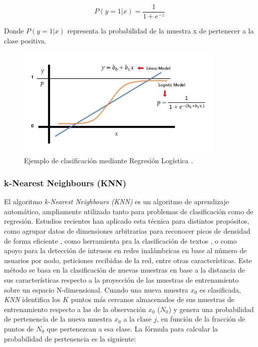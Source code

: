 \documentclass{uathesis-es}
\begin{document}
	\[
	P(y = 1 | x) = \frac{1}{1 + e^{-z}}
	\]
	
	Donde $P(y = 1 | x)$ representa la probabilidad de la muestra x de pertenecer a la clase positiva.
	
	
	\begin{figure}[h]
		\centering
		\includegraphics[width=10cm]{Figures/Background/LogReg_1.png}
		\caption{Ejemplo de clasificación mediante Regresión Logística \cite{LR}.}
		\label{LR_BACKGROUND}
	\end{figure}
	
	
	\subsubsection*{k-Nearest Neighbours (KNN)}
	
	El algoritmo \textit{k-Nearest Neighbours (KNN)} es un algoritmo de aprendizaje automático, ampliamente utilizado tanto para problemas de clasificación como de regresión. Estudios recientes han aplicado esta técnica para distintos propósitos, como agrupar datos de dimensiones arbitrarias para reconocer picos de densidad de forma eficiente \cite{chen2020fast}, como herramienta pra la clasificación de textos \cite{CHEN2020523}, o como apoyo para la detección de intrusos en redes inalámbricas \cite{liu2022enhanced} en base al número de usuarios por nodo, peticiones recibidas de la red, entre otras características. Este método se basa en la clasificación de nuevas muestras en base a la distancia de sus características respecto a la proyección de las muestras de entrenamiento sobre un espacio N-dimensional. Cuando una nueva muestra $x_0$ es clasificada, \textit{KNN} identifica los $K$ puntos más cercanos almacenados de sus muestras de entrenamiento respecto a las de la observación $x_0$ ($N_0$) y genera una probabilidad de pertenencia de la nueva muestra $x_0$ a la clase $j$, en función de la fracción de puntos de $N_0$ que pertenezcan a esa clase. La fórmula para calcular la probabilidad de pertenencia es la siguiente:
	
\end{document}
